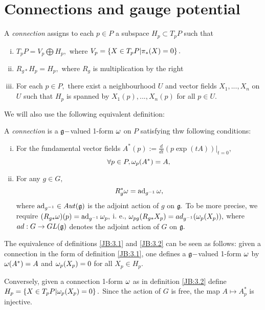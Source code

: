 \section{Connections and gauge potential}

\begin{defn}[\cite{DB}, 1.2.1]
\label{JB:3.1}
A \emph{connection} assigns to each $p \in P$ a subspace $H_{p} \subset T_{p}P$ such that
\begin{enumerate}[(i)]
 \item $T_{p}P= V_{p} \bigoplus H_{p},$ where $V_{p}=\left\{ X \in T_{p}P| \pi_{*}(X)=0 \right\}.$
\item $R_{g*}H_{p}=H_{p},$ where $R_{g}$ is multiplication by the right
\item For each $p\in P,$ there exist a neighbourhood $U$ and vector fields $X_{1},...,X_{n}$ on $U$ such that $H_{p}$
is spanned by $X_{1}(p),...,X_{n}(p)$ for all $p \in U.$
\end{enumerate}
\end{defn}

We will also use the following equivalent definition:
\begin{defn}[\cite{DB}, 1.2.2]
 \label{JB:3.2}
A \emph{connection} is a $\mathfrak{g}-$valued 1-form $\omega$ on $P$ satisfying thw following conditions:
\begin{enumerate}[(i)]
 \item For the fundamental vector fields $A^{*}(p):= \frac{d}{dt}(p \exp(tA))|_{t=0},$
$$
\forall p \in P, \omega_{p}(A^{*})=A,
$$
\item For any $g \in G,$
$$
R^{*}_{g}\omega =\operatorname{ad}_{g^{-1}}\omega,
$$
where $\operatorname{ad}_{g^{-1}} \in Aut(\mathfrak{g})$ is the adjoint action of $g$ on $\mathfrak{g}.$ To be more precise, we require
$(R_{g*}\omega)(p)=\operatorname{ad}_{g^{-1}}\omega_{p},$ i. e., $\omega_{pg}(R_{g*}X_{p})=ad_{g^{-1}}(\omega_{p}(X_{p})),$ where $ad:G \to
GL(\mathfrak{g})$ denotes the adjoint action of $G$ on $\mathfrak{g}.$
\end{enumerate}
\end{defn}

The equivalence of definitions \ref{JB:3.1} and  \ref{JB:3.2} can be seen as follows: given a connection in the form of
definition \ref{JB:3.1}, one defines a $\mathfrak{g}-$valued 1-form $\omega$ by $\omega(A^{*})=A$ and $\omega_{p}(X_{p})=0$ for all
$X_{p} \in H_{p}.$

Conversely, given a connection 1-form $\omega$ as in definition \ref{JB:3.2} define $H_{p}=\left\{ X \in T_{p}P |
\omega_{p}(X_{p})=0 \right\}.$ Since the action of $G$ is free, the map $A \mapsto A^{*}_{p}$ is injective. 


